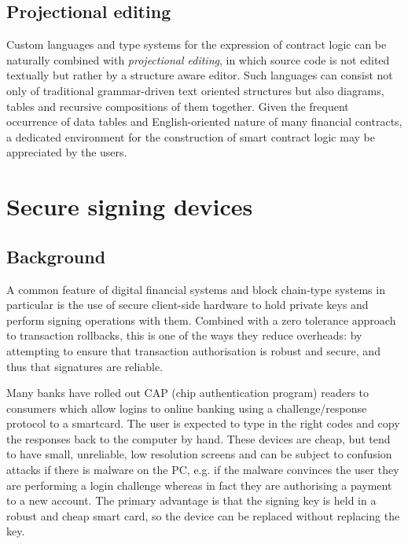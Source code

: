 \documentclass{article}
\begin{document}
\subsection{Projectional editing}

Custom languages and type systems for the expression of contract logic can be naturally combined with \emph{projectional
editing}, in which source code is not edited textually but rather by a structure aware
editor\cite{DBLP:conf/models/VoelterL14}. Such languages can consist not only of traditional grammar-driven text
oriented structures but also diagrams, tables and recursive compositions of them together. Given the frequent occurrence
of data tables and English-oriented nature of many financial contracts, a dedicated environment for the construction of
smart contract logic may be appreciated by the users.

\section{Secure signing devices}\label{sec:secure-signing-devices}

\subsection{Background}

A common feature of digital financial systems and block chain-type systems in particular is the use of secure client-side
hardware to hold private keys and perform signing operations with them. Combined with a zero tolerance approach to
transaction rollbacks, this is one of the ways they reduce overheads: by attempting to ensure that transaction
authorisation is robust and secure, and thus that signatures are reliable.

Many banks have rolled out CAP (chip authentication program) readers to consumers which allow logins to online banking using a
challenge/response protocol to a smartcard. The user is expected to type in the right codes and copy the responses back
to the computer by hand. These devices are cheap, but tend to have small, unreliable, low resolution screens and can be
subject to confusion attacks if there is malware on the PC, e.g. if the malware convinces the user they are performing
a login challenge whereas in fact they are authorising a payment to a new account. The primary advantage is that the
signing key is held in a robust and cheap smart card, so the device can be replaced without replacing the key.
\end{document}
